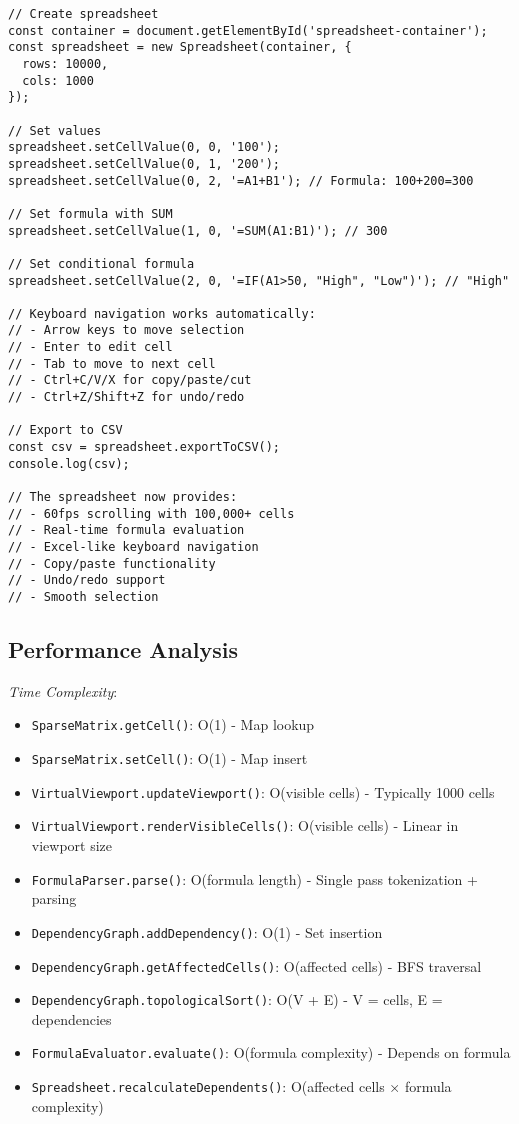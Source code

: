 \documentclass[11pt]{article}
\begin{document}
\begin{verbatim}
// Create spreadsheet
const container = document.getElementById('spreadsheet-container');
const spreadsheet = new Spreadsheet(container, {
  rows: 10000,
  cols: 1000
});

// Set values
spreadsheet.setCellValue(0, 0, '100');
spreadsheet.setCellValue(0, 1, '200');
spreadsheet.setCellValue(0, 2, '=A1+B1'); // Formula: 100+200=300

// Set formula with SUM
spreadsheet.setCellValue(1, 0, '=SUM(A1:B1)'); // 300

// Set conditional formula
spreadsheet.setCellValue(2, 0, '=IF(A1>50, "High", "Low")'); // "High"

// Keyboard navigation works automatically:
// - Arrow keys to move selection
// - Enter to edit cell
// - Tab to move to next cell
// - Ctrl+C/V/X for copy/paste/cut
// - Ctrl+Z/Shift+Z for undo/redo

// Export to CSV
const csv = spreadsheet.exportToCSV();
console.log(csv);

// The spreadsheet now provides:
// - 60fps scrolling with 100,000+ cells
// - Real-time formula evaluation
// - Excel-like keyboard navigation
// - Copy/paste functionality
// - Undo/redo support
// - Smooth selection
\end{verbatim}
\subsection{Performance Analysis}
\label{sec:org30cca2f}

\emph{Time Complexity}:

\begin{itemize}
\item \texttt{SparseMatrix.getCell()}: O(1) - Map lookup
\item \texttt{SparseMatrix.setCell()}: O(1) - Map insert
\item \texttt{VirtualViewport.updateViewport()}: O(visible cells) - Typically 1000 cells
\item \texttt{VirtualViewport.renderVisibleCells()}: O(visible cells) - Linear in viewport size
\item \texttt{FormulaParser.parse()}: O(formula length) - Single pass tokenization + parsing
\item \texttt{DependencyGraph.addDependency()}: O(1) - Set insertion
\item \texttt{DependencyGraph.getAffectedCells()}: O(affected cells) - BFS traversal
\item \texttt{DependencyGraph.topologicalSort()}: O(V + E) - V = cells, E = dependencies
\item \texttt{FormulaEvaluator.evaluate()}: O(formula complexity) - Depends on formula
\item \texttt{Spreadsheet.recalculateDependents()}: O(affected cells × formula complexity)
\end{itemize}
\end{document}

